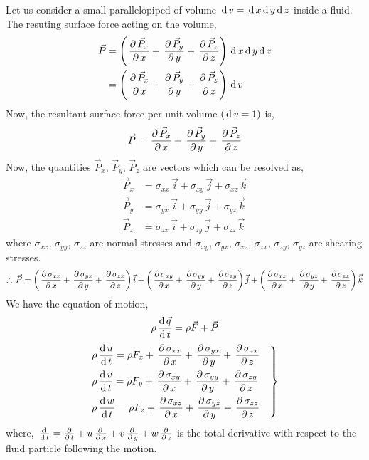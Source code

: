 \documentclass[../main-sheet.tex]{subfiles}
\begin{document}
\begin{soln}
    Let us consider a small parallelopiped of volume \(\,\mathrm{d}\, v=\,\mathrm{d}\, x\,\mathrm{d}\, y\,\mathrm{d}\, z\) inside a fluid. The resuting surface force acting on the volume,
    \begin{align*}
        \vec{P}&=\left( \,\frac{\partial\, \vec{P}_x}{\partial\, x}+\,\frac{\partial\, \vec{P}_y}{\partial\, y}+\,\frac{\partial\, \vec{P}_z}{\partial\, z} \right)\,\mathrm{d}\, x\,\mathrm{d}\, y\,\mathrm{d}\, z\\
        &=\left( \,\frac{\partial\, \vec{P}_x}{\partial\, x}+\,\frac{\partial\, \vec{P}_y}{\partial\, y}+\,\frac{\partial\, \vec{P}_z}{\partial\, z} \right)\,\mathrm{d}\, v
    \end{align*}
    Now, the resultant surface force per unit volume \((\,\mathrm{d}\, v=1)\) is,
    \[
        \vec{P}=\,\frac{\partial\, \vec{P}_x}{\partial\, x}+\,\frac{\partial\, \vec{P}_y}{\partial\, y}+\,\frac{\partial\, \vec{P}_z}{\partial\, z}
    \]
    Now, the quantities \(\vec{P}_x\), \(\vec{P}_y\), \(\vec{P}_z\) are vectors which can be resolved as,
    \begin{align*}
        \vec{P}_x&=\sigma_{xx}\,\vec{i}+\sigma_{xy}\,\vec{j}+\sigma_{xz}\,\vec{k}\\
        \vec{P}_y&=\sigma_{yx}\,\vec{i}+\sigma_{yy}\,\vec{j}+\sigma_{yz}\,\vec{k}\\
        \vec{P}_z&=\sigma_{zx}\,\vec{i}+\sigma_{zy}\,\vec{j}+\sigma_{zz}\,\vec{k}
    \end{align*}
    where \(\sigma_{xx}\), \(\sigma_{yy}\), \(\sigma_{zz}\) are normal stresses and \(\sigma_{xy}\), \(\sigma_{yx}\), \(\sigma_{xz}\), \(\sigma_{zx}\), \(\sigma_{zy}\), \(\sigma_{yz}\) are shearing stresses.
    \[
        \therefore \,\vec{P}=
        \left( \,\frac{\partial\, \sigma_{xx}}{\partial\, x}+\,\frac{\partial\, \sigma_{yx}}{\partial\, y}+\,\frac{\partial\, \sigma_{zx}}{\partial\, z} \right)\vec{i}+
        \left( \,\frac{\partial\, \sigma_{xy}}{\partial\, x}+\,\frac{\partial\, \sigma_{yy}}{\partial\, y}+\,\frac{\partial\, \sigma_{zy}}{\partial\, z} \right)\vec{j}+
        \left( \,\frac{\partial\, \sigma_{xz}}{\partial\, x}+\,\frac{\partial\, \sigma_{yz}}{\partial\, y}+\,\frac{\partial\, \sigma_{zz}}{\partial\, z} \right)\vec{k}
    \]
    We have the equation of motion,
    \[\rho\,\frac{\mathrm{d}\,\vec{q}}{\mathrm{d}\,t}=\rho\vec{F}+\vec{P}\]
\begin{equation}
    \begin{rcases}
        \displaystyle\rho\,\frac{\mathrm{d}\,u}{\mathrm{d}\,t}=\rho F_x+\,\frac{\partial\, \sigma_{xx}}{\partial\, x}+\,\frac{\partial\, \sigma_{yx}}{\partial\, y}+\,\frac{\partial\, \sigma_{zx}}{\partial\, z}\\
        \displaystyle\rho\,\frac{\mathrm{d}\,v}{\mathrm{d}\,t}=\rho F_y+\,\frac{\partial\, \sigma_{xy}}{\partial\, x}+\,\frac{\partial\, \sigma_{yy}}{\partial\, y}+\,\frac{\partial\, \sigma_{zy}}{\partial\, z}\\
        \displaystyle\rho\,\frac{\mathrm{d}\,w}{\mathrm{d}\,t}=\rho F_z+\,\frac{\partial\, \sigma_{xz}}{\partial\, x}+\,\frac{\partial\, \sigma_{yz}}{\partial\, y}+\,\frac{\partial\, \sigma_{zz}}{\partial\, z}\quad
    \end{rcases}\label{eq:navier1}
\end{equation}
where, \(\,\frac{\mathrm{d}\,}{\mathrm{d}\,t}=\frac{\partial}{\partial\,t}+u\,\frac{\partial\, }{\partial\, x}+v\,\frac{\partial\, }{\partial\, y}+w\,\frac{\partial\, }{\partial\, z}\) is the total derivative with respect to the fluid particle following the motion.\\



\end{soln}
\end{document}
